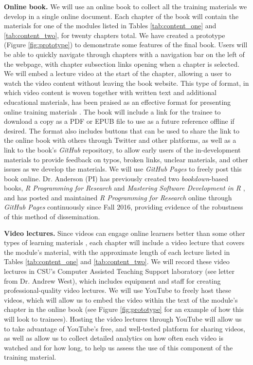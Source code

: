 \documentclass[pdftex,english,11.5pt,parskip=half]{scrartcl}
\begin{document}
\textbf{Online book.} We will use an online book to collect all the training
materials we develop in a single online document. Each chapter of the book will contain the
materials for one of the modules listed in Tables \ref*{tab:content_one} and
\ref*{tab:content_two}, for twenty chapters total. We have created a prototype
(Figure \ref*{fig:prototype}) to demonstrate some features of the final book.
Users will be able to quickly navigate through chapters with a navigation bar on
the left of the webpage, with chapter subsection links opening when a chapter is
selected. We will embed a lecture video at the start of the chapter, allowing
a user to watch the video content without leaving the book website. This type of format, 
in which video content is woven together with written text and additional educational materials, has been
praised as an effective format for presenting online training materials \cite{searls2012online}.
The book will
include a link for the trainee to download a copy as a PDF or EPUB file to use
as a future reference offline if desired. The format also includes buttons that
can be used to share the link to the online book with others through Twitter and
other platforms, as well as a link to the book's \textit{GitHub} repository, to allow
early users of the in-development materials to provide feedback on typos, broken
links, unclear materials, and other issues as we develop the
materials. 
We will use \textit{GitHub Pages} \cite{gitpages} to
freely post this book online. Dr. Anderson (PI) has previously created two
\textit{bookdown}-based books, \textit{R Programming for Research} \cite{andersoncoursebook} and
\textit{Mastering Software Development in R} \cite{andersonmastering}, and has posted and maintained
\textit{R Programming for Research} online through \textit{GitHub Pages} continuously since Fall 2016, providing evidence of the robustness of this method of dissemination.  

\textbf{Video lectures.} 
Since videos can engage online learners better than some other types of learning materials \cite{searls2012ten}, each chapter will include a video lecture that covers
the module's material, with the approximate length of each lecture listed in
Tables \ref*{tab:content_one} and \ref*{tab:content_two}. We will record these
video lectures in CSU's Computer Assisted Teaching Support laboratory (see
letter from Dr. Andrew West), which includes equipment and staff for creating
professional-quality video lectures. We will use YouTube \cite{youtube} to freely host these
videos, which will allow us to embed the video within the text of the module's chapter in the
online book (see Figure \ref*{fig:prototype} for an example of how this will look
to trainees). Hosting the video lectures through YouTube will allow
us to take advantage of YouTube's free, and well-tested platform for
sharing videos, as well as allow us to collect detailed analytics on how often
each video is watched and for how long, to help us assess the use of this
component of the training material. 
\end{document}
